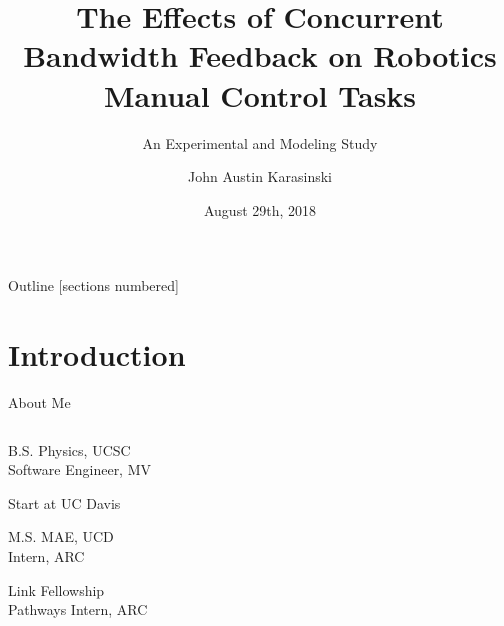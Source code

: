 \documentclass[10pt]{beamer}
\title{The Effects of Concurrent Bandwidth Feedback on Robotics Manual Control Tasks}
\subtitle{An Experimental and Modeling Study}
\date{August 29th, 2018}
\author{John Austin Karasinski}
\institute{Qualifying Examination}
\begin{document}
\maketitle

\begin{frame}{Outline}
  [sections numbered]
  \tableofcontents[]
\end{frame}

\section{Introduction}

\newcommand\topsp{-0.25in} %

\begin{frame}[fragile]{About Me}
  \begin{columns}[T]
    \begin{column}{.6\textwidth}
      \begin{description}[align=right]
        \setlength\itemsep{1em}
        \item [2012] B.S. Physics, UCSC\\
                     Software Engineer, MV
        \item [2013] Start at UC Davis
        \item [2016] M.S. MAE, UCD\\
                     Intern, ARC
        \item [2017] Link Fellowship\\
                     Pathways Intern, ARC
      \end{description}
    \end{column}
    \begin{column}{.4\textwidth}

\end{column}
\end{columns}
\end{frame}
\end{document}
